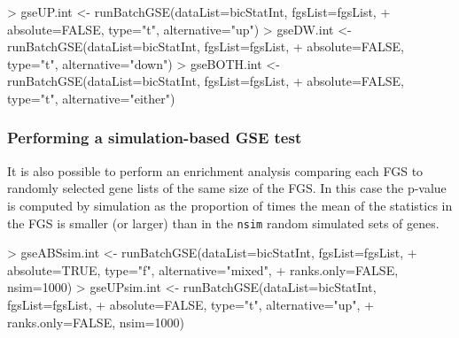 \documentclass[11pt]{article}
\newcommand{\Rfunarg}[1]{{\texttt{#1}}}
\begin{document}
\begin{Schunk}
\begin{Sinput}
> gseUP.int <- runBatchGSE(dataList=bicStatInt, fgsList=fgsList,
+ 				 absolute=FALSE, type="t", alternative="up")
> gseDW.int <- runBatchGSE(dataList=bicStatInt, fgsList=fgsList,
+ 				 absolute=FALSE, type="t", alternative="down")
> gseBOTH.int <- runBatchGSE(dataList=bicStatInt, fgsList=fgsList,
+ 				 absolute=FALSE, type="t", alternative="either")
\end{Sinput}
\end{Schunk}

\subsubsection{Performing a simulation-based GSE test}
It is also possible to perform an enrichment analysis comparing each FGS
to randomly selected gene lists of the same size of the FGS.
In this case  the p-value is computed by simulation as the proportion 
of times the mean of the statistics in the FGS is smaller (or larger) than in the 
\Rfunarg{nsim} random simulated sets of genes.

\begin{Schunk}
\begin{Sinput}
> gseABSsim.int <- runBatchGSE(dataList=bicStatInt, fgsList=fgsList,
+ 				    absolute=TRUE, type="f", alternative="mixed",
+ 				    ranks.only=FALSE, nsim=1000)
> gseUPsim.int <- runBatchGSE(dataList=bicStatInt, fgsList=fgsList,
+ 				    absolute=FALSE, type="t", alternative="up",
+ 				    ranks.only=FALSE, nsim=1000)
\end{Sinput}
\end{Schunk}
\end{document}
